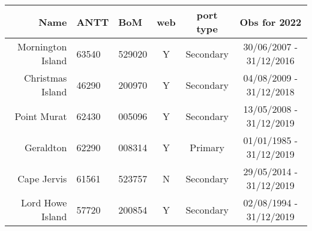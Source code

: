 \begin{specialtable}[H]\centering
\begin{tabular}{ r|p{1cm}|p{1.2cm}|c|c|c }
Name 
 & ANTT 
 & BoM 
 & web  
 & port type
 & Obs for 2022
  \\ 
\toprule
Mornington Island 
 & 63540 
 & 529020 
 & Y 
 & Secondary 
 & 30/06/2007 - 31/12/2016
 \\
Christmas Island  
 & 46290 
 & 200970 
 & Y 
 & Secondary 
 & 04/08/2009 - 31/12/2018
 \\
Point Murat       
 & 62430 
 & 005096 
 & Y 
 & Secondary 
 & 13/05/2008 - 31/12/2019
 \\
Geraldton         
 & 62290 
 & 008314 
 & Y
 & Primary   
 & 01/01/1985 - 31/12/2019
 \\
Cape Jervis       
 & 61561 
 & 523757 
 & N 
 & Secondary
 & 29/05/2014 - 31/12/2019
 \\
Lord Howe Island  
 & 57720 
 & 200854  
 & Y 
 & Secondary 
 & 02/08/1994 - 31/12/2019
 
 \\
\end{tabular}
\label{tab:sites}
\end{specialtable}
